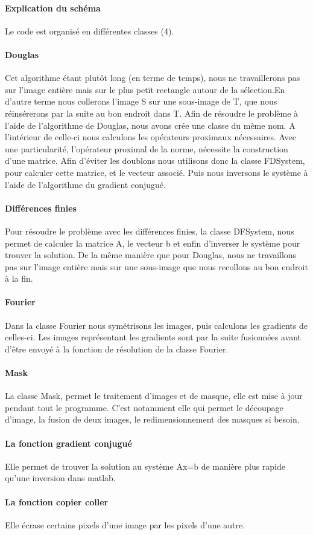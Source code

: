 \paragraph{Explication du schéma}
Le code est organisé en différentes classes (4).
\paragraph{Douglas}
Cet algorithme étant plutôt long (en terme de temps), nous ne travaillerons pas sur l'image entière mais sur le plus petit rectangle autour de la sélection.En d'autre terme nous collerons l'image S sur une sous-image de T, que nous réinsérerons par la suite au bon endroit dans T. Afin de résoudre le problème à l'aide de l'algorithme de Douglas, nous avons crée une classe du même nom.  A l'intérieur de celle-ci nous calculons les opérateurs proximaux nécessaires. Avec une particularité, l'opérateur proximal de la norme, nécessite la construction d'une matrice. Afin d'éviter les doublons nous utilisons donc la classe FDSystem, pour calculer cette matrice, et le vecteur associé. Puis nous inversons le système à l'aide de l'algorithme du gradient conjugué. 
\paragraph{Différences finies}
Pour résoudre le problème avec les différences finies, la classe DFSystem, nous permet de calculer la matrice A, le vecteur b et enfin d'inverser le système pour trouver la solution. De la même manière que pour Douglas, nous ne travaillons pas sur l'image entière mais sur une sous-image que nous recollons au bon endroit à la fin.
\paragraph{Fourier}
Dans la classe Fourier nous symétrisons les images, puis calculons les gradients de celles-ci. Les images représentant les gradients sont par la suite fusionnées avant d'être envoyé à la fonction de résolution de la classe Fourier. 
\paragraph{Mask}
La classe Mask, permet le traitement d'images et de masque, elle est mise à jour pendant tout le programme. C'est notamment elle qui permet le découpage d'image, la fusion de deux images, le redimensionnement des masques si besoin. 
\paragraph{La fonction gradient conjugué}
Elle permet de trouver la solution au système Ax=b de manière plus rapide qu'une inversion dans matlab.
\paragraph{La fonction copier coller} 
Elle écrase certains pixels d'une image par les pixels d'une autre.